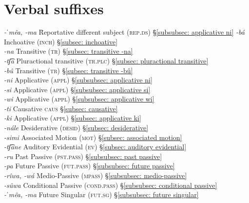 \chapter{Verbal suffixes}
\label{chap: verbal suffixes}

\begin{tabbing}
\textit{-ˈmêa, -ma}\hspace{1ex} \= Reportative different subject (\textsc{rep.ds})\hspace{1ex} \= §\ref{subsubsec: applicative ni}\kill
\textit{-bá}  \> Inchoative (\textsc{inch}) \> §\ref{subsec: inchoative}\\
\textit{-na}  \> Transitive (\textsc{tr}) \> §\ref{subsec: transitive -na} \\
\textit{-tʃ͡a}  \> Pluractional transitive (\textsc{tr.plc}) \> §\ref{subsec: pluractional transitive}\\
\textit{-bû} \> Transitive (\textsc{tr}) \> §\ref{subsec: transitive -bû}\\
\textit{-ni}  \> Applicative (\textsc{appl}) \> §\ref{subsubsec: applicative ni}\\
\textit{-si}  \> Applicative (\textsc{appl}) \> §\ref{subsubsec: applicative si}\\
\textit{-wi} \> Applicative (\textsc{appl}) \> §\ref{subsubsec: applicative wi}\\
\textit{-ti}  \> Causative \textsc{caus} \> §\ref{subsec: causative}\\
\textit{-ki}   \> Applicative (\textsc{appl}) \> §\ref{subsec: applicative ki}\\
\textit{-nále} \> Desiderative (\textsc{desid}) \> §\ref{subsec: desiderative}\\
\textit{-simi} \> Associated Motion (\textsc{mot}) \> §\ref{subsec: associated motion}\\
\textit{-tʃ͡ane} \> Auditory Evidential (\textsc{ev}) \> §\ref{subsec: auditory evidential}\\
\textit{-ru} \> Past Passive (\textsc{pst.pass}) \> §\ref{subsubsec: past passive}\\
\textit{-pa} \> Future Passive (\textsc{fut.pass}) \> §\ref{subsubsec: future passive}\\
\textit{-rîwa, -wá} \> Medio-Passive (\textsc{mpass}) \> §\ref{subsubsec: medio-passive}\\
\textit{-sûwa} \> Conditional Passive (\textsc{cond.pass}) \> §\ref{subsubsec: conditional passive}\\
\textit{-ˈmêa, -ma} \> Future Singular  (\textsc{fut.sg}) \> §\ref{subsubsec: future singular}\\

\end{tabbing}

